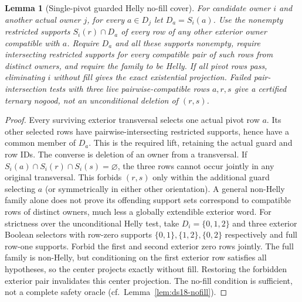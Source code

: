 \documentclass[11pt]{article}
\newtheorem{lemma}[theorem]{Lemma}
\begin{document}
\begin{lemma}[Single-pivot guarded Helly no-fill cover]\label{lem:bh18-pivot}
For candidate owner $i$ and another actual owner $j$, for every $a\in D_j$ let $D_a=S_i(a)$. Use the nonempty restricted supports $S_i(r)\cap D_a$ of every row of any other exterior owner compatible with $a$. Require $D_a$ and all these supports nonempty, require intersecting restricted supports for every compatible pair of such rows from distinct owners, and require the family to be Helly. If all pivot rows pass, eliminating $i$ without fill gives the exact existential projection. Failed pair-intersection tests with three live pairwise-compatible rows $a,r,s$ give a certified ternary nogood, not an unconditional deletion of $(r,s)$.
\end{lemma}
\begin{proof}
Every surviving exterior transversal selects one actual pivot row $a$. Its other selected rows have pairwise-intersecting restricted supports, hence have a common member of $D_a$. This is the required lift, retaining the actual guard and row IDs. The converse is deletion of an owner from a transversal. If $S_i(a)\cap S_i(r)\cap S_i(s)=\varnothing$, the three rows cannot occur jointly in any original transversal. This forbids $(r,s)$ only within the additional guard selecting $a$ (or symmetrically in either other orientation). A general non-Helly family alone does not prove its offending support sets correspond to compatible rows of distinct owners, much less a globally extendible exterior word.
For strictness over the unconditional Helly test, take $D_i=\{0,1,2\}$ and three exterior Boolean selectors with row-zero supports $\{0,1\},\{1,2\},\{0,2\}$ respectively and full row-one supports. Forbid the first and second exterior zero rows jointly. The full family is non-Helly, but conditioning on the first exterior row satisfies all hypotheses, so the center projects exactly without fill. Restoring the forbidden exterior pair invalidates this center projection. The no-fill condition is sufficient, not a complete safety oracle (cf.\ Lemma~\ref{lem:ds18-nofill}).
\end{proof}
\end{document}
